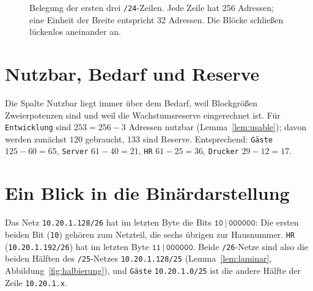\documentclass[a4paper,12pt, twoside]{report}
\theoremstyle{definition}
\begin{document}
\begin{figure}[ht]
\centering
{}
\caption{Belegung der ersten drei \texttt{/24}-Zeilen. Jede Zeile hat 256 Adressen; eine Einheit der Breite entspricht 32 Adressen. Die Blöcke schließen lückenlos aneinander an.}
\label{fig:belegung}
\end{figure}

\section{Nutzbar, Bedarf und Reserve}

Die Spalte \glqq Nutzbar\grqq{} liegt immer über dem Bedarf, weil Blockgrößen Zweierpotenzen sind und weil die Wachstumsreserve eingerechnet ist. Für \texttt{Entwicklung} sind $253 = 256 - 3$ Adressen nutzbar (Lemma~\ref{lem:usable}); davon werden zunächst $120$ gebraucht, $133$ sind Reserve. Entsprechend: \texttt{Gäste} $125-60 = 65$, \texttt{Server} $61-40 = 21$, \texttt{HR} $61-25 = 36$, \texttt{Drucker} $29-12 = 17$.

\section{Ein Blick in die Binärdarstellung}

Das Netz \texttt{10.20.1.128/26} hat im letzten Byte die Bits $\texttt{10}\,|\,\texttt{000000}$: Die ersten beiden Bit (\texttt{10}) gehören zum Netzteil, die sechs übrigen zur Hausnummer. \texttt{HR} (\texttt{10.20.1.192/26}) hat im letzten Byte $\texttt{11}\,|\,\texttt{000000}$. Beide \texttt{/26}-Netze sind also die beiden Hälften des \texttt{/25}-Netzes \texttt{10.20.1.128/25} (Lemma~\ref{lem:laminar}, Abbildung~\ref{fig:halbierung}), und \texttt{Gäste} \texttt{10.20.1.0/25} ist die andere Hälfte der Zeile \texttt{10.20.1.x}.
\end{document}
